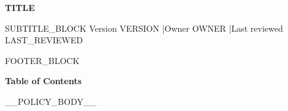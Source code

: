 \documentclass[11pt]{article}
\begin{document}
\thispagestyle{empty}
\vspace*{6mm}
{\color{TFHead}\Huge\bfseries\sffamily TITLE}\par
SUBTITLE_BLOCK
\vspace{3mm}
{\color{TFText}\large Version VERSION \quad|\quad Owner OWNER \quad|\quad Last reviewed LAST_REVIEWED}\par
\vspace{10mm}
\noindent
{}
\vfill
FOOTER_BLOCK
\newpage

{\sffamily\bfseries\color{TFHead}\Large Table of Contents}\par
\vspace{6pt}
\tableofcontents
\newpage

__POLICY_BODY__
\end{document}
